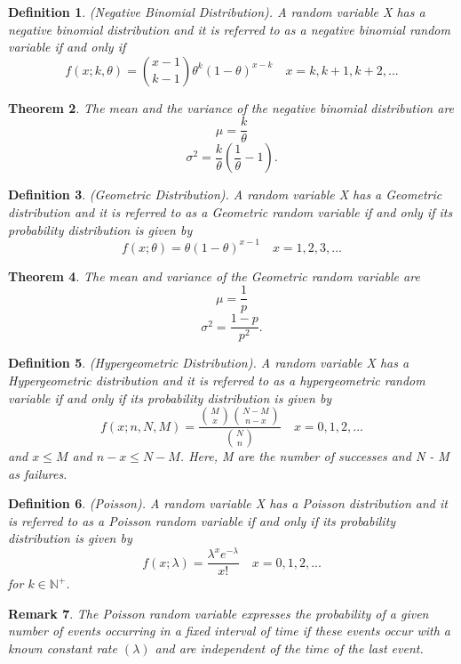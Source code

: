 \documentclass[twoside]{article}
\newcounter{lecnum}
\newtheorem{theorem}{Theorem}[lecnum]
\newtheorem{definition}[theorem]{Definition}
\newtheorem{remark}[theorem]{Remark}
\begin{document}
\begin{definition}(Negative Binomial Distribution). A random variable X has a negative binomial distribution and it is referred to as a negative binomial random variable if and only if 
$$
f(x;k,\theta) = {x-1\choose k-1}\theta^k(1-\theta)^{x-k} \quad x=k,k+1,k+2,...
$$
\end{definition}

\begin{theorem}The mean and the variance of the negative binomial distribution are 
$$
\mu = \frac{k}{\theta}
$$
$$
\sigma^2 = \frac{k}{\theta}(\frac{1}{\theta} - 1).
$$
\end{theorem}



\begin{definition}(Geometric Distribution). A random variable X has a Geometric distribution and it is referred to as a Geometric random variable if and only if its probability distribution is given by 
$$
f(x; \theta) = \theta(1-\theta)^{x-1} \quad x=1,2,3,...
$$
\end{definition}

\begin{theorem}The mean and variance of the Geometric random variable are 
$$
\mu = \frac{1}{p}
$$
$$
\sigma^2 = \frac{1-p}{p^2}.
$$
\end{theorem}


\begin{definition}(Hypergeometric Distribution). A random variable X has a Hypergeometric distribution and it is referred to as a hypergeometric random variable if and only if its probability distribution is given by 
$$
f(x;n,N,M) = \frac{{M \choose x}{N - M \choose n - x}}{{N \choose n}} \quad x = 0,1,2,...
$$
and $x \leq M$ and $n - x \leq N - M$. Here, M are the number of successes and N - M as failures.
\end{definition}

\begin{definition}(Poisson). A random variable X has a Poisson distribution and it is referred to as a Poisson random variable if and only if its probability distribution is given by 
$$
f(x; \lambda) = \frac{\lambda^xe^{-\lambda}}{x!} \quad x=0,1,2,...
$$
for $k \in \mathbb{N}^+$.
\end{definition}


\begin{remark}The Poisson random variable expresses the probability of a given number of events occurring in a fixed interval of time if these events occur with a known constant rate $(\lambda)$ and are independent of the time of the last event.
\end{remark}
\end{document}

